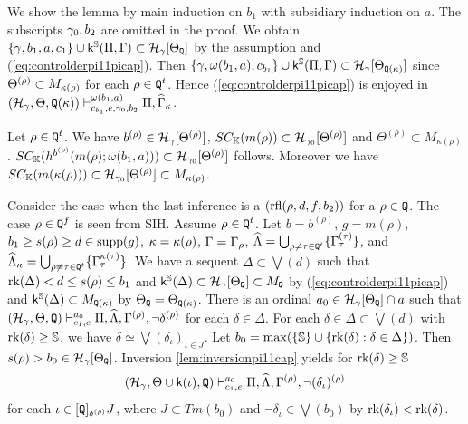 \documentclass{article}
\newcommand{\mS}{\mathbb{S}}
\newcommand{\mK}{\mathbb{K}}
\begin{document}
\elem
\bprf
We show the lemma
by main induction on $b_{1}$
with subsidiary induction on $a$.
The subscripts $\gamma_{0}, b_{2}$ are omitted in the proof.
We obtain $\{\gam,b_{1},a,c_{1}\}\cup\sfk^{\mS}(\Pi,\Gam)\subset\calh_{\gam}[\Tht_{{\tt Q}}]$ by the assumption and (\ref{eq:controlderpi11picap}).
Then 
$\{\gam,\ome(b_{1},a),c_{b_{1}}\}\cup\sfk^{\mS}(\Pi,\Gam)\subset\calh_{\gam}[\Tht_{{\tt Q}(\kap)}]$ since $\Theta^{(\rho)}\subset M_{\kappa(\rho)}$ for
each $\rho\in{\tt Q}^{t}$.
Hence (\ref{eq:controlderpi11picap}) is enjoyed in 
$
(\mathcal{H}_{\gamma},\Theta,{\tt Q}(\kappa)
)
\vdash^{\omega(b_{1},a)}_{c_{b_{1}}, e,\gamma_{0},b_{2}}
\Pi,\widehat{\Gamma}_{\kappa}
$.


 
 
Let $\rho\in{\tt Q}^{t}$.
We have 
$b^{(\rho)}\in{\cal H}_{\gamma}[\Theta^{(\rho)}]$, 
$SC_{\mK}(m(\rho))\subset \calh_{\gam_{0}}[\Tht^{(\rho)}]$ and
$\Theta^{(\rho)}\subset M_{\kappa(\rho)}$.
$SC_{\mK}(h^{b^{(\rho)}}(m(\rho);\ome(b_{1},a)))\subset \calh_{\gam_{0}}[\Tht^{(\rho)}]$
follows.
Moreover we have
$SC_{\mK}(m(\kap(\rho)))\subset\calh_{\gam_{0}}[\Tht^{(\rho)}]\subset M_{\kap(\rho)}$.




Consider the case when the last inference is a $({\rm rfl}(\rho,d,f,b_{2}))$ for a $\rho\in{\tt Q}$.
The case $\rho\in{\tt Q}^{f}$ is seen from SIH.
Assume $\rho\in{\tt Q}^{t}$. Let $b=b^{(\rho)}$,
$g=m(\rho)$, $b_{1}\geq s(\rho)\geq d\in {\rm supp}(g)$, $\kappa=\kappa(\rho)$,
$\Gamma=\Gamma_{\rho}$,
$\widehat{\Lambda}=\bigcup_{\rho\neq\tau\in{\tt Q}^{t}}\{\Gamma_{\tau}^{(\tau)}\}$, and
$\widehat{\Lambda}_{\kappa}=\bigcup_{\rho\neq\tau\in{\tt Q}^{t}}\{\Gamma_{\tau}^{\kappa(\tau)}\}$.
We have a sequent $\Delta\subset\bigvee(d)$ such that ${\rm rk}(\Delta)<d\leq s(\rho)\leq b_{1}$ 
and
$\sfk^{\mS}(\Del)\subset\mathcal{H}_{\gamma}[\Theta_{{\tt Q}}]\subset M_{{\tt Q}}$ by (\ref{eq:controlderpi11picap})
and $\sfk^{\mS}(\Del)\subset M_{{\tt Q}(\kap)}$ by $\Theta_{{\tt Q}}=\Theta_{{\tt Q}(\kappa)}$.
There is an ordinal $a_{0}\in{\cal H}_{\gamma}[\Theta_{{\tt Q}}]\cap a$ such that 
$
(\mathcal{H}_{\gamma},\Theta,
{\tt Q}
)
\vdash^{a_{0}}_{c_{1},e}
\Pi,\widehat{\Lambda},\Gamma^{(\rho)}, 
\lnot\delta^{(\rho)}
$
for each $\delta\in\Delta$.
For each $\delta\in\Delta\subset\bigvee(d)$ with $\rk(\del)\geq\mS$, we have 
$\delta\simeq \bigvee\left(\delta_{\iota}\right)_{\iota\in J}$.
Let $b_{0}=\max(\{\mathbb{S}\}\cup\{\mbox{{\rm rk}}(\delta) :\delta\in\Delta\})$.
Then 
$s(\rho)>b_{0}\in\mathcal{H}_{\gamma}[\Theta_{{\tt Q}}]$.
Inversion \ref{lem:inversionpi11cap} yields for $\rk(\del)\geq\mS$
\begin{equation}\label{eq:Case1api11}
(\mathcal{H}_{\gamma},\Theta\cup{\sf k}(\iota),
{\tt Q}
)
\vdash^{a_{0}}_{c_{1},e}
\Pi,\widehat{\Lambda},\Gamma^{(\rho)},\lnot(\delta_{\iota})^{(\rho)}
\end{equation}
for each 
$\iota\in[{\tt Q}]_{\delta^{(\rho)}}J$,
where $J\subset Tm(b_{0})$ and $\lnot\delta_{\iota}\in\bigvee(b_{0})$ by
$\mbox{{\rm rk}}(\delta_{\iota})<\mbox{{\rm rk}}(\delta)$.
\end{document}
